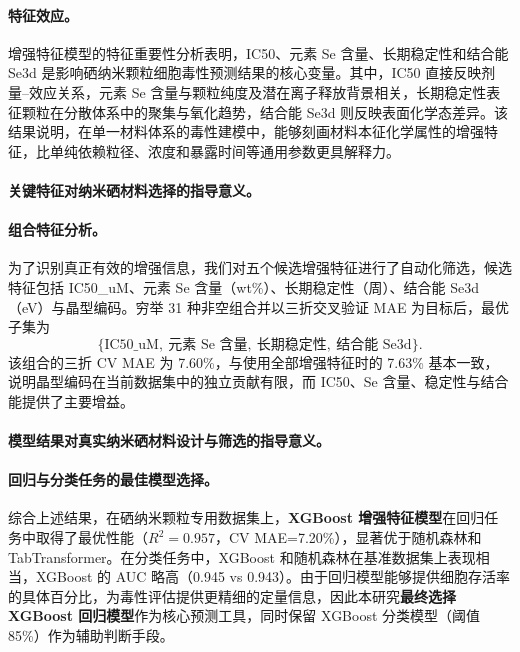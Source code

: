 \paragraph{特征效应。}
增强特征模型的特征重要性分析表明，IC50、元素 Se 含量、长期稳定性和结合能 Se3d 是影响硒纳米颗粒细胞毒性预测结果的核心变量。其中，IC50 直接反映剂量--效应关系，元素 Se 含量与颗粒纯度及潜在离子释放背景相关，长期稳定性表征颗粒在分散体系中的聚集与氧化趋势，结合能 Se3d 则反映表面化学态差异。该结果说明，在单一材料体系的毒性建模中，能够刻画材料本征化学属性的增强特征，比单纯依赖粒径、浓度和暴露时间等通用参数更具解释力。

\paragraph{关键特征对纳米硒材料选择的指导意义。}

\paragraph{组合特征分析。}
为了识别真正有效的增强信息，我们对五个候选增强特征进行了自动化筛选，候选特征包括 IC50\_uM、元素 Se 含量（wt\%）、长期稳定性（周）、结合能 Se3d（eV）与晶型编码。穷举 31 种非空组合并以三折交叉验证 MAE 为目标后，最优子集为
\[
\{\text{IC50\_uM},\ \text{元素 Se 含量},\ \text{长期稳定性},\ \text{结合能 Se3d}\}.
\]
该组合的三折 CV MAE 为 7.60\%，与使用全部增强特征时的 7.63\% 基本一致，说明晶型编码在当前数据集中的独立贡献有限，而 IC50、Se 含量、稳定性与结合能提供了主要增益。

\paragraph{模型结果对真实纳米硒材料设计与筛选的指导意义。}

\paragraph{回归与分类任务的最佳模型选择。}
综合上述结果，在硒纳米颗粒专用数据集上，\textbf{XGBoost 增强特征模型}在回归任务中取得了最优性能（$R^2=0.957$，CV MAE=7.20\%），显著优于随机森林和 TabTransformer。在分类任务中，XGBoost 和随机森林在基准数据集上表现相当，XGBoost 的 AUC 略高（0.945 vs 0.943）。由于回归模型能够提供细胞存活率的具体百分比，为毒性评估提供更精细的定量信息，因此本研究\textbf{最终选择 XGBoost 回归模型}作为核心预测工具，同时保留 XGBoost 分类模型（阈值 85\%）作为辅助判断手段。

